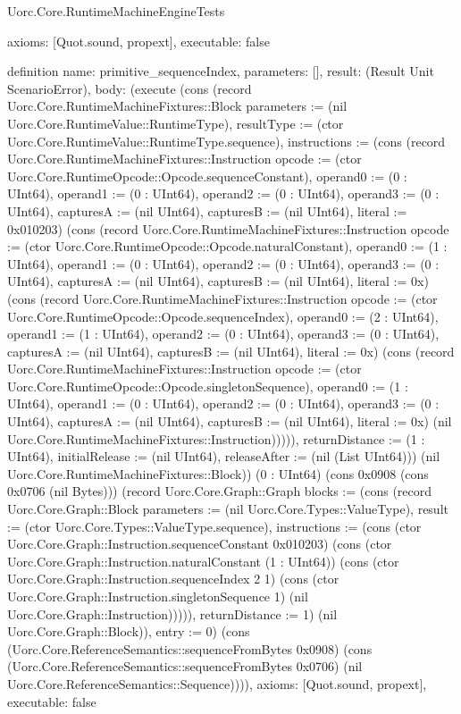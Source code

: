 \begin{lexlean}{Uorc.Core.RuntimeMachineEngineTests}
\begin{semanticmodule}
{  axioms: [Quot.sound, propext],
  executable: false
}

definition{
  name: primitive_sequenceIndex,
  parameters: [],
  result: (Result Unit ScenarioError),
  body: (execute (cons (record Uorc.Core.RuntimeMachineFixtures::Block {parameters := (nil Uorc.Core.RuntimeValue::RuntimeType), resultType := (ctor Uorc.Core.RuntimeValue::RuntimeType.sequence), instructions := (cons (record Uorc.Core.RuntimeMachineFixtures::Instruction {opcode := (ctor Uorc.Core.RuntimeOpcode::Opcode.sequenceConstant), operand0 := (0 : UInt64), operand1 := (0 : UInt64), operand2 := (0 : UInt64), operand3 := (0 : UInt64), capturesA := (nil UInt64), capturesB := (nil UInt64), literal := 0x010203}) (cons (record Uorc.Core.RuntimeMachineFixtures::Instruction {opcode := (ctor Uorc.Core.RuntimeOpcode::Opcode.naturalConstant), operand0 := (1 : UInt64), operand1 := (0 : UInt64), operand2 := (0 : UInt64), operand3 := (0 : UInt64), capturesA := (nil UInt64), capturesB := (nil UInt64), literal := 0x}) (cons (record Uorc.Core.RuntimeMachineFixtures::Instruction {opcode := (ctor Uorc.Core.RuntimeOpcode::Opcode.sequenceIndex), operand0 := (2 : UInt64), operand1 := (1 : UInt64), operand2 := (0 : UInt64), operand3 := (0 : UInt64), capturesA := (nil UInt64), capturesB := (nil UInt64), literal := 0x}) (cons (record Uorc.Core.RuntimeMachineFixtures::Instruction {opcode := (ctor Uorc.Core.RuntimeOpcode::Opcode.singletonSequence), operand0 := (1 : UInt64), operand1 := (0 : UInt64), operand2 := (0 : UInt64), operand3 := (0 : UInt64), capturesA := (nil UInt64), capturesB := (nil UInt64), literal := 0x}) (nil Uorc.Core.RuntimeMachineFixtures::Instruction))))), returnDistance := (1 : UInt64), initialRelease := (nil UInt64), releaseAfter := (nil (List UInt64))}) (nil Uorc.Core.RuntimeMachineFixtures::Block)) (0 : UInt64) (cons 0x0908 (cons 0x0706 (nil Bytes))) (record Uorc.Core.Graph::Graph {blocks := (cons (record Uorc.Core.Graph::Block {parameters := (nil Uorc.Core.Types::ValueType), result := (ctor Uorc.Core.Types::ValueType.sequence), instructions := (cons (ctor Uorc.Core.Graph::Instruction.sequenceConstant 0x010203) (cons (ctor Uorc.Core.Graph::Instruction.naturalConstant (1 : UInt64)) (cons (ctor Uorc.Core.Graph::Instruction.sequenceIndex 2 1) (cons (ctor Uorc.Core.Graph::Instruction.singletonSequence 1) (nil Uorc.Core.Graph::Instruction))))), returnDistance := 1}) (nil Uorc.Core.Graph::Block)), entry := 0}) (cons (Uorc.Core.ReferenceSemantics::sequenceFromBytes 0x0908) (cons (Uorc.Core.ReferenceSemantics::sequenceFromBytes 0x0706) (nil Uorc.Core.ReferenceSemantics::Sequence)))),
  axioms: [Quot.sound, propext],
  executable: false
}


\end{semanticmodule}
\end{lexlean}
